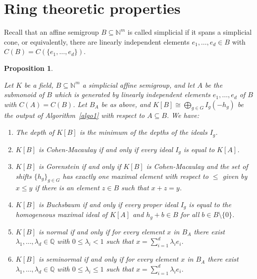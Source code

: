 \documentclass[11pt,a4paper]{amsart}%
\newtheorem{proposition}[theorem]{Proposition}
\theoremstyle{definition}
\theoremstyle{remark}
\numberwithin{equation}{section}
\theoremstyle{plain}
\begin{document}
\section{Ring theoretic properties}\label{sec simplicial case}



Recall that an affine semigroup $B\subseteq\mathbb N^m$ is called simplicial if it spans a simplicial cone, or equivalently, there are linearly independent elements $e_1,\ldots,e_d\in B$ with $C(B)=C(\{e_1,\ldots,e_d\})$.



\begin{proposition}\label{char}

Let $K$ be a field, $B\subseteq \mathbb N^m$ a simplicial affine semigroup, and let $A$ be the submonoid of $B$ which is generated by linearly independent elements $e_1,\ldots,e_d$ of $B$ with \mbox{$C(A)=C(B)$}. Let $B_A$ be as above, and $K[B]\cong\bigoplus_{g\in G} I_{g}(-h_g)$ be the output of Algorithm~\ref{algo1} with respect to $A\subseteq B$. We have:

\begin{enumerate}

\item The depth of $K[B]$ is the minimum of the depths of the ideals $I_g$.

\item $K[B]$ is Cohen-Macaulay if and only if every ideal $I_g$ is equal to $K[A]$.

\item $K[B]$ is Gorenstein if and only if $K[B]$ is Cohen-Macaulay and the set of shifts $\{h_g\}_{g\in G}$ has exactly one maximal element with respect to $\leq$ given by $x\leq y$ if there is an element $z\in B$ such that $x+z=y$.

\item $K[B]$ is Buchsbaum if and only if every proper ideal $I_g$ is equal to the homogeneous maximal ideal of $K[A]$ and $h_g+b\in B$ for all $b\in B\setminus\{0\}$.

\item $K[B]$ is normal if and only if for every element $x$ in $B_{A}$ there exist $\lambda_{1},\ldots,\lambda_{d}\in\mathbb{Q}$ with $0\leq\lambda_{i}<1$ such that $x=\sum_{i=1}^{d}\lambda_{i}e_{i}$.

\item $K[B]$ is seminormal if and only if for every element $x$ in $B_{A}$ there exist $\lambda_{1},\ldots,\lambda_{d}\in\mathbb{Q}$ with $0\leq\lambda_{i}\leq1$ such that $x=\sum_{i=1}^{d}\lambda_{i}e_{i}$.

\end{enumerate}

\end{proposition}
\end{document}
